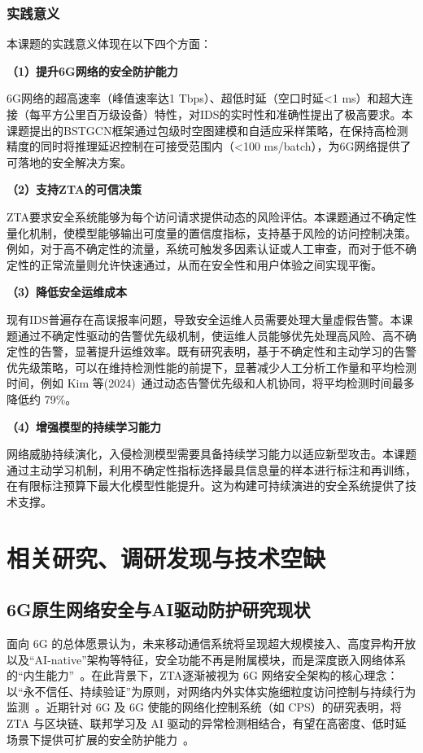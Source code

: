 \subsubsection{实践意义}

本课题的实践意义体现在以下四个方面：

\textbf{（1）提升6G网络的安全防护能力}

6G网络的超高速率（峰值速率达1 Tbps）、超低时延（空口时延<1 ms）和超大连接（每平方公里百万级设备）特性，对IDS的实时性和准确性提出了极高要求。本课题提出的BSTGCN框架通过包级时空图建模和自适应采样策略，在保持高检测精度的同时将推理延迟控制在可接受范围内（<100 ms/batch），为6G网络提供了可落地的安全解决方案。

\textbf{（2）支持ZTA的可信决策}

ZTA要求安全系统能够为每个访问请求提供动态的风险评估。本课题通过不确定性量化机制，使模型能够输出可度量的置信度指标，支持基于风险的访问控制决策。例如，对于高不确定性的流量，系统可触发多因素认证或人工审查，而对于低不确定性的正常流量则允许快速通过，从而在安全性和用户体验之间实现平衡。

\textbf{（3）降低安全运维成本}

现有IDS普遍存在高误报率问题，导致安全运维人员需要处理大量虚假告警。本课题通过不确定性驱动的告警优先级机制，使运维人员能够优先处理高风险、高不确定性的告警，显著提升运维效率。既有研究表明，基于不确定性和主动学习的告警优先级策略，可以在维持检测性能的前提下，显著减少人工分析工作量和平均检测时间，例如 Kim 等(2024)~\cite{Kim2024HumanInLoop}通过动态告警优先级和人机协同，将平均检测时间最多降低约 79\%。

\textbf{（4）增强模型的持续学习能力}

网络威胁持续演化，入侵检测模型需要具备持续学习能力以适应新型攻击。本课题通过主动学习机制，利用不确定性指标选择最具信息量的样本进行标注和再训练，在有限标注预算下最大化模型性能提升。这为构建可持续演进的安全系统提供了技术支撑。



\section{相关研究、调研发现与技术空缺}

\subsection{6G原生网络安全与AI驱动防护研究现状}

面向 6G 的总体愿景认为，未来移动通信系统将呈现超大规模接入、高度异构开放以及“AI-native”架构等特征，安全功能不再是附属模块，而是深度嵌入网络体系的“内生能力”~\cite{IMT2030_6G_WhitePaper_2021}。在此背景下，ZTA逐渐被视为 6G 网络安全架构的核心理念：以“永不信任、持续验证”为原则，对网络内外实体实施细粒度访问控制与持续行为监测~\cite{NIST-ZTA,Chen_ZTA_6G_2022,Alnaim_ZT_CPS_6G_2025}。近期针对 6G 及 6G 使能的网络化控制系统（如 CPS）的研究表明，将 ZTA 与区块链、联邦学习及 AI 驱动的异常检测相结合，有望在高密度、低时延场景下提供可扩展的安全防护能力~\cite{Alnaim_ZT_CPS_6G_2025,6GIA_Security_Position_2025}。

